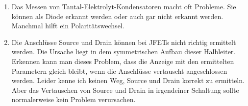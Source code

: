 \begin{enumerate}
\item Das Messen von Tantal-Elektrolyt-Kondensatoren macht oft Probleme.
Sie können als Diode erkannt werden oder auch gar nicht erkannt werden.
Manchmal hilft ein Polaritätswechsel.

\item Die Anschlüsse Source und Drain können bei JFETs nicht richtig ermittelt werden.
Die Ursache liegt in dem symmetrischen Aufbau dieser Halbleiter.
Erkennen kann man dieses Problem, dass die Anzeige mit den ermittelten Parametern gleich bleibt,
wenn die Anschlüsse vertauscht angeschlossen werden.
Leider kenne ich keinen Weg, Source und Drain korrekt zu ermitteln.
Aber das Vertauschen von Source und Drain in irgendeiner Schaltung sollte normalerweise kein Problem verursachen.

\end{enumerate}
